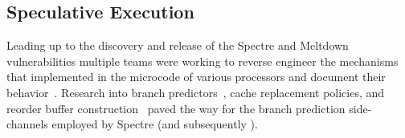 



\subsection{Speculative Execution}

Leading up to the discovery and release of the Spectre and Meltdown vulnerabilities
multiple teams were working to reverse engineer the mechanisms that implemented in 
the microcode of various processors and document their
behavior~\cite{intel-instruction-tables,project_zero,measuring-cache,measuring-rob}.
Research into branch predictors~\cite{godbolt2016branch}, cache replacement
policies, and reorder buffer construction~\cite{measuring-rob} paved the way for
the branch prediction side-channels employed by Spectre (and subsequently
\speculake).

